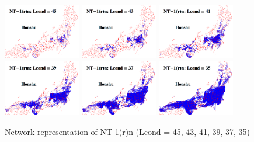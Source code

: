 \documentclass[output=paper]{LSP/langsci}
\begin{document}
\begin{figure}
\includegraphics[width=0.3\textwidth]{illustrations/kuma_fig24-1}
\includegraphics[width=0.3\textwidth]{illustrations/kuma_fig24-2}
\includegraphics[width=0.3\textwidth]{illustrations/kuma_fig24-3}
\\
\includegraphics[width=0.3\textwidth]{illustrations/kuma_fig24-4}
\includegraphics[width=0.3\textwidth]{illustrations/kuma_fig24-5}
\includegraphics[width=0.3\textwidth]{illustrations/kuma_fig24-6}
\caption{Network representation of NT-1(r)n (Lcond = 45, 43, 41, 39, 37, 35)}
\label{fig:24}
\end{figure}
\end{document}
